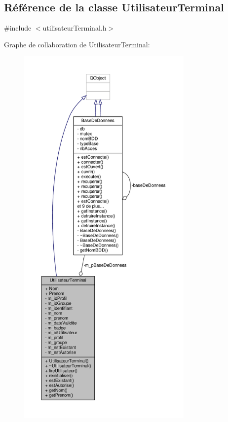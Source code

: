 \hypertarget{class_utilisateur_terminal}{}\subsection{Référence de la classe Utilisateur\+Terminal}
\label{class_utilisateur_terminal}


{\ttfamily \#include $<$utilisateur\+Terminal.\+h$>$}



Graphe de collaboration de Utilisateur\+Terminal\+:\nopagebreak
\begin{figure}[H]
\begin{center}
\leavevmode
\includegraphics[height=550pt]{class_utilisateur_terminal__coll__graph}
\end{center}
\end{figure}
